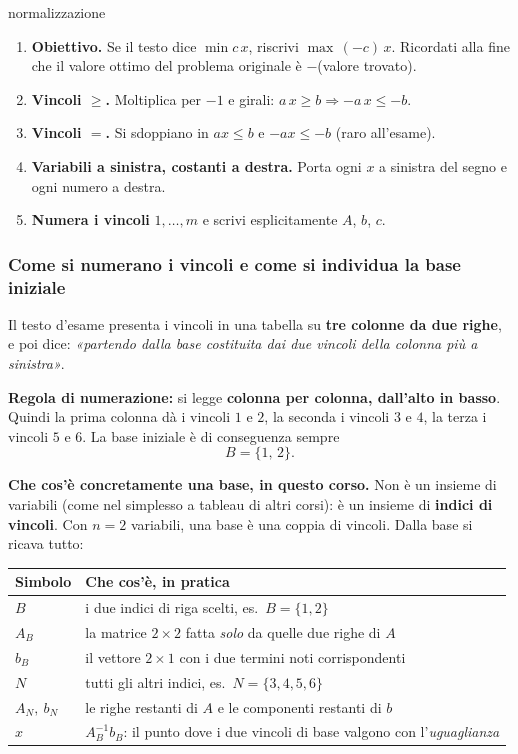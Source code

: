 \documentclass[11pt,a4paper]{article}
\begin{document}
\begin{ric}{normalizzazione}
\begin{enumerate}
\item \textbf{Obiettivo.} Se il testo dice $\min c\,x$, riscrivi $\max\, (-c)\,x$.
      Ricordati alla fine che il valore ottimo del problema originale è $-$(valore trovato).
\item \textbf{Vincoli $\ge$.} Moltiplica per $-1$ e girali: $a\,x \ge b \Longrightarrow -a\,x \le -b$.
\item \textbf{Vincoli $=$.} Si sdoppiano in $a x \le b$ e $-a x \le -b$ (raro all'esame).
\item \textbf{Variabili a sinistra, costanti a destra.} Porta ogni $x$ a sinistra del segno
      e ogni numero a destra.
\item \textbf{Numera i vincoli} $1,\dots,m$ e scrivi esplicitamente $A$, $b$, $c$.
\end{enumerate}
\end{ric}

\subsubsection{Come si numerano i vincoli e come si individua la base iniziale}
\label{sec:base}

Il testo d'esame presenta i vincoli in una tabella su \textbf{tre colonne da due righe},
e poi dice: \emph{«partendo dalla base costituita dai due vincoli della colonna più a sinistra»}.

\begin{idea}
\textbf{Regola di numerazione:} si legge \textbf{colonna per colonna, dall'alto in basso}.
Quindi la prima colonna dà i vincoli $1$ e $2$, la seconda i vincoli $3$ e $4$, la terza i
vincoli $5$ e $6$. La base iniziale è di conseguenza sempre
\[ B = \{1,\,2\}. \]
\end{idea}

\textbf{Che cos'è concretamente una base, in questo corso.} Non è un insieme di variabili
(come nel simplesso a tableau di altri corsi): è un insieme di \textbf{indici di vincoli}.
Con $n=2$ variabili, una base è una coppia di vincoli. Dalla base si ricava tutto:

\begin{center}
\begin{tabular}{@{}p{3.2cm} p{11.3cm}@{}}
\toprule
\textbf{Simbolo} & \textbf{Che cos'è, in pratica}\\
\midrule
$B$ & i due indici di riga scelti, es.\ $B=\{1,2\}$\\
$A_B$ & la matrice $2\times 2$ fatta \emph{solo} da quelle due righe di $A$\\
$b_B$ & il vettore $2\times 1$ con i due termini noti corrispondenti\\
$N$ & tutti gli altri indici, es.\ $N=\{3,4,5,6\}$\\
$A_N,\ b_N$ & le righe restanti di $A$ e le componenti restanti di $b$\\
$x$ & $A_B^{-1} b_B$: il punto dove i due vincoli di base valgono con l'\emph{uguaglianza}\\
\bottomrule
\end{tabular}
\end{center}
\end{document}
